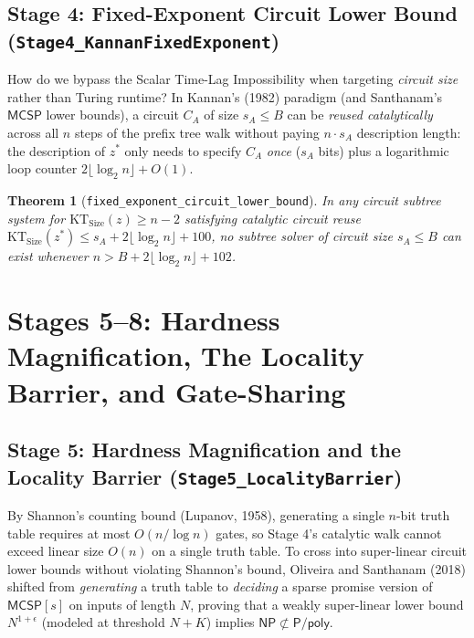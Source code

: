\documentclass[11pt,a4paper]{article}
\theoremstyle{plain}
\newtheorem{theorem}{Theorem}[section]
\theoremstyle{definition}
\theoremstyle{remark}
\newcommand{\lean}[1]{\texttt{\textcolor{slate}{#1}}}
\newcommand{\MCSP}{\mathsf{MCSP}}
\newcommand{\NP}{\mathsf{NP}}
\newcommand{\Ppoly}{\mathsf{P/poly}}
\newcommand{\KT}{\mathrm{KT}}
\begin{document}
\subsection{Stage 4: Fixed-Exponent Circuit Lower Bound (\lean{Stage4\_KannanFixedExponent})}
How do we bypass the Scalar Time-Lag Impossibility when targeting \emph{circuit size} rather than Turing runtime? In Kannan's (1982) paradigm (and Santhanam's $\MCSP$ lower bounds), a circuit $C_A$ of size $s_A \le B$ can be \emph{reused catalytically} across all $n$ steps of the prefix tree walk without paying $n \cdot s_A$ description length: the description of $z^*$ only needs to specify $C_A$ \emph{once} ($s_A$ bits) plus a logarithmic loop counter $2\lfloor \log_2 n \rfloor + O(1)$.

\begin{theorem}[\lean{fixed\_exponent\_circuit\_lower\_bound}]
In any circuit subtree system for $\KT_{\text{Size}}(z) \ge n - 2$ satisfying catalytic circuit reuse $\KT_{\text{Size}}(z^*) \le s_A + 2\lfloor \log_2 n \rfloor + 100$, no subtree solver of circuit size $s_A \le B$ can exist whenever $n > B + 2\lfloor \log_2 n \rfloor + 102$.
\end{theorem}

\section{Stages 5--8: Hardness Magnification, The Locality Barrier, and Gate-Sharing}

\subsection{Stage 5: Hardness Magnification and the Locality Barrier (\lean{Stage5\_LocalityBarrier})}
By Shannon's counting bound (Lupanov, 1958), generating a single $n$-bit truth table requires at most $O(n / \log n)$ gates, so Stage 4's catalytic walk cannot exceed linear size $O(n)$ on a single truth table. To cross into super-linear circuit lower bounds without violating Shannon's bound, Oliveira and Santhanam (2018) shifted from \emph{generating} a truth table to \emph{deciding} a sparse promise version of $\MCSP[s]$ on inputs of length $N$, proving that a weakly super-linear lower bound $N^{1+\epsilon}$ (modeled at threshold $N + K$) implies $\NP \not\subset \Ppoly$.
\end{document}
